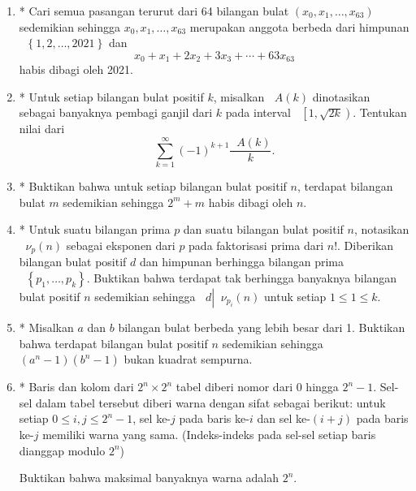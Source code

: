 \documentclass[12pt]{article}
\newcommand*\lrbr[1]{\mathop{}\!\left\lbrace#1\right\rbrace}
\newcommand*\lkrb[1]{\mathop{}\!\left[{#1}\right)}
\newcommand*\func[2]{\mathop{}\!{#1}{\left({#2}\right)}}
\newcommand*\divid[2]{\mathop{}\!{#1} \left| {#2} \right.}
\begin{document}
\begin{enumerate}[leftmargin=*]
		\item* Cari semua pasangan terurut dari 64 bilangan bulat $ \left(x_{0}, x_{1}, \dots, x_{63}\right) $ sedemikian sehingga $ x_{0}, x_{1}, \dots, x_{63} $ merupakan anggota berbeda dari himpunan $ \lrbr{1, 2, \dots, 2021} $ dan
		\[ x_{0} + x_{1} + 2x_{2} + 3x_{3} + \cdots + 63x_{63} \]
		habis dibagi oleh 2021.
		\item* Untuk setiap bilangan bulat positif $ k $, misalkan $ \func{A}{k} $ dinotasikan sebagai banyaknya pembagi ganjil dari $ k $ pada interval $ \lkrb{1, \sqrt{2k}} $. Tentukan nilai dari
		\[ \sum_{k = 1}^{\infty}{\left(-1\right)^{k + 1}\frac{\func{A}{k}}{k}}. \]
		\item* Buktikan bahwa untuk setiap bilangan bulat positif $ n $, terdapat bilangan bulat $ m $ sedemikian sehingga $ 2^{m} + m $ habis dibagi oleh $ n $.
		\item* Untuk suatu bilangan prima $ p $ dan suatu bilangan bulat positif $ n $, notasikan $ \func{\nu_{p}}{n} $ sebagai eksponen dari $ p $ pada faktorisasi prima dari $ n! $. Diberikan bilangan bulat positif $ d $ dan himpunan berhingga bilangan prima $ \lrbr{p_{1}, \dots, p_{k}} $. Buktikan bahwa terdapat tak berhingga banyaknya bilangan bulat positif $ n $ sedemikian sehingga $ \divid{d}{\func{\nu_{p_{i}}}{n}} $ untuk setiap $ 1 \leq 1 \leq k $.
		\item* Misalkan $ a $ dan $ b $ bilangan bulat berbeda yang lebih besar dari 1. Buktikan bahwa terdapat bilangan bulat positif $ n $ sedemikian sehingga $ \left(a^{n} - 1\right)\left(b^{n} - 1\right) $ bukan kuadrat sempurna.
		\item* Baris dan kolom dari $ 2^{n} \times 2^{n} $ tabel diberi nomor dari 0 hingga $ 2^{n} - 1 $. Sel-sel dalam tabel tersebut diberi warna dengan sifat sebagai berikut: untuk setiap $ 0 \leq i, j \leq 2^{n} - 1 $, sel ke-$ j $ pada baris ke-$ i $ dan sel ke-$ \left(i + j\right) $ pada baris ke-$ j $ memiliki warna yang sama. (Indeks-indeks pada sel-sel setiap baris dianggap modulo $ 2^{n} $)
		\par \noindent Buktikan bahwa maksimal banyaknya warna adalah $ 2^{n} $.
	\end{enumerate}
\end{document}
